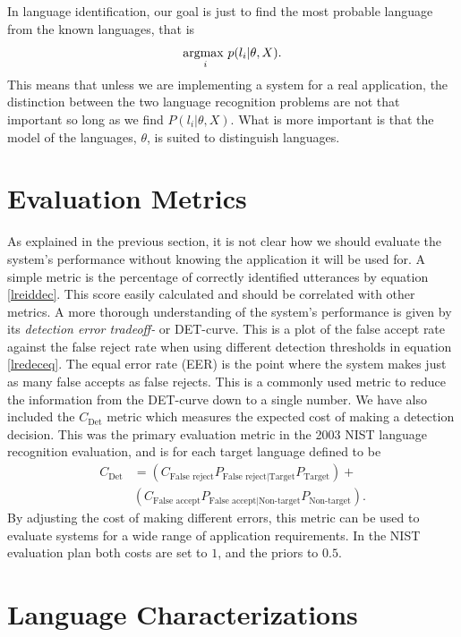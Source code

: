  In language identification, our goal is just to find the most probable language from the known languages, that is
\begin{equation}
\label{lreiddec}
\underset{i}{\operatorname{argmax\text{ }}} p(l_i | \theta, X).
\end{equation}
This means that unless we are implementing a system for a real application, the distinction between the two language recognition problems are not that important so long as we find $P(l_i | \theta, X)$. What is more important is that the model of the languages, $\theta$, is suited to distinguish languages.

\section{Evaluation Metrics}

As explained in the previous section, it is not clear how we should evaluate the system's performance without knowing the application it will be used for. A simple metric is the percentage of correctly identified utterances by equation \ref{lreiddec}. This score easily calculated and should be correlated with other metrics. A more thorough understanding of the system's performance is given by its \emph{detection error tradeoff-} or DET-curve. This is a plot of the false accept rate against the false reject rate when using different detection thresholds in equation \ref{lredeceq}. The equal error rate (EER) is the point where the system makes just as many false accepts as false rejects. This is a commonly used metric to reduce the information from the DET-curve down to a single number. We have also included the $C_{\text{Det}}$ metric which measures the expected cost of making a detection decision. This was the primary evaluation metric in the 2003 NIST language recognition evaluation, and is for each target language defined to be \cite{martin2003nist}
\begin{align*}
C_{\text{Det}} &=(C_{\text{False reject}}P_{\text{False reject} | \text{Target}}P_{\text{Target}})+\\
&(C_{\text{False accept}}P_{\text{False accept} | \text{Non-target}}P_{\text{Non-target}}).
\end{align*}
By adjusting the cost of making different errors, this metric can be used to evaluate systems for a wide range of application requirements. In the NIST evaluation plan both costs are set to $1$, and the priors to $0.5$. 

\section{Language Characterizations}

